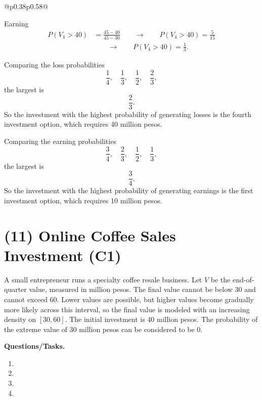 \begin{center}
\begin{tabular}{@{}p{0.38\textwidth}p{0.58\textwidth}@{}}
\begin{minipage}[c]{\linewidth}
			Earning
			\[
			\begin{aligned}
				P(V_4>40)&=\frac{45-40}{45-30}
				\qquad \longrightarrow \qquad
				P(V_4>40)=\frac{5}{15}\\
				&\qquad \longrightarrow \qquad
				P(V_4>40)=\frac13.
			\end{aligned}
			\]
		\end{minipage}
	\end{tabular}
\end{center}

Comparing the loss probabilities
\[
\frac14,\quad \frac13,\quad \frac12,\quad \frac23,
\]
the largest is
\[
\frac23.
\]
So the investment with the highest probability of generating losses is the fourth investment option, which requires 40 million pesos.

Comparing the earning probabilities
\[
\frac34,\quad \frac23,\quad \frac12,\quad \frac13,
\]
the largest is
\[
\frac34.
\]
So the investment with the highest probability of generating earnings is the first investment option, which requires 10 million pesos.


\section{(11) Online Coffee Sales Investment (C1)}
\label{sec:online-coffee-sales-investment-c1}

A small entrepreneur runs a specialty coffee resale business. Let $V$ be the end-of-quarter value, measured in million pesos. The final value cannot be below $30$ and cannot exceed $60$. Lower values are possible, but higher values become gradually more likely across this interval, so the final value is modeled with an increasing density on $[30,60]$. The initial investment is $40$ million pesos. The probability of the extreme value of 30 million pesos can be considered to be 0.

\textbf{Questions/Tasks.}
\begin{enumerate}[label=\textbf{\alph*)}]
	\item {}
	\item {}
	\item {}
	\item {}

\end{enumerate}


